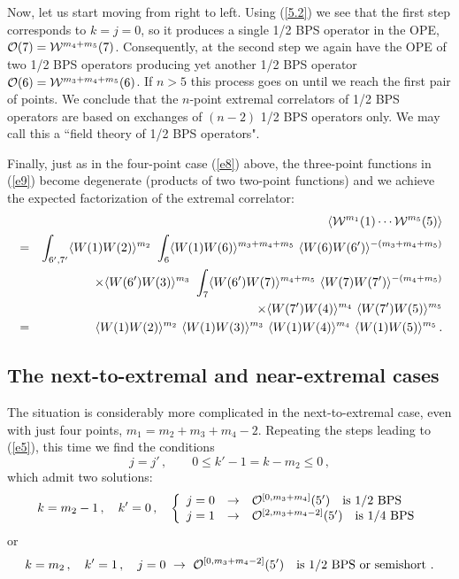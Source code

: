 \documentclass[a4paper,11pt]{article}
\begin{document}
Now, let us start moving from right to left. Using (\ref{5.2}) we see that the
first step corresponds to $k=j=0$, so it produces a single 1/2 BPS operator in
the OPE, ${\cal O}(7) = {\cal W}^{m_4+m_5}(7)$. Consequently, at the second
step we again have the OPE of two 1/2 BPS operators producing yet another 1/2
BPS operator ${\cal O}(6) = {\cal W}^{m_3+m_4+m_5}(6)$. If $n>5$ this process
goes on until we reach the first pair of points. We conclude that the
$n$-point extremal correlators of 1/2 BPS operators are based on exchanges of
$(n-2)$ 1/2 BPS operators only. We may call this a ``field theory of 1/2 BPS
operators".

Finally, just as in the four-point case (\ref{e8}) above, the three-point
functions in (\ref{e9}) become degenerate (products of two two-point functions)
and we achieve the expected factorization of the extremal correlator:
\begin{eqnarray}
  && \hskip-2cm \langle {\cal W}^{m_1}(1) \cdots {\cal W}^{m_5}(5) \rangle
  \label{e11} \\
  &=&\int_{6',7'}  \langle W(1) W(2) \rangle^{m_2} \
  \int_{6} \langle W(1) W(6) \rangle^{m_3+m_4+m_5} \
  \langle W(6) W(6') \rangle^{-(m_3+m_4+m_5)}    \nonumber\\
  &&\qquad \times  \langle W(6') W(3) \rangle^{m_3} \
  \int_{7} \langle W(6') W(7) \rangle^{m_4+m_5} \
  \langle W(7) W(7') \rangle^{-(m_4+m_5)}    \nonumber\\
  &&\qquad \times  \langle W(7') W(4) \rangle^{m_4}\
   \langle W(7') W(5) \rangle^{m_5}      \nonumber\\
  &=& \langle W(1) W(2) \rangle^{m_2} \ \langle W(1) W(3) \rangle^{m_3} \
  \langle W(1) W(4) \rangle^{m_4}\ \langle W(1) W(5) \rangle^{m_5} \,. \nonumber
\end{eqnarray}

\subsection{The next-to-extremal and near-extremal cases}

The situation is considerably more complicated in the next-to-extremal case,
even with just four points, $m_1=m_2+m_3+m_4-2$. Repeating the steps leading to
(\ref{e5}), this time we find the conditions
\begin{equation}\label{e12}
  j=j'\,, \qquad 0 \leq k'-1 = k-m_2 \leq 0 \, ,
\end{equation}
which admit two solutions:
\begin{equation}\label{e13}
   k=m_2-1\,, \quad k'=0\,, \quad \left\{
  \begin{array}{lll}
    j=0 & \rightarrow & {\cal O}^{[0,m_3+m_4]}(5')\quad \mbox{is 1/2 BPS} \\
    j=1 & \rightarrow & {\cal O}^{[2,m_3+m_4-2]}(5')\quad \mbox{is 1/4 BPS}
  \end{array}\right.
\end{equation}
or
\begin{equation}\label{e14}
   k=m_2\,, \quad k'=1\,, \quad j=0 \  \rightarrow \
  {\cal O}^{[0,m_3+m_4-2]}(5')\quad \mbox{is 1/2 BPS or semishort}  \ .
\end{equation}
\end{document}
